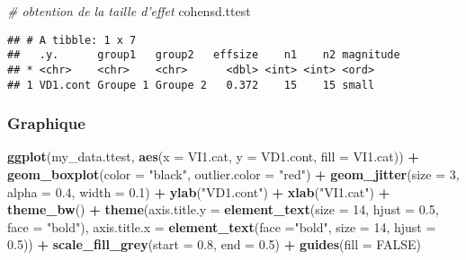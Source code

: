 \documentclass[
]{book}
\newenvironment{Shaded}{\begin{snugshade}}{\end{snugshade}}
\newcommand{\CommentTok}[1]{\textcolor[rgb]{0.56,0.35,0.01}{\textit{#1}}}
\newcommand{\DataTypeTok}[1]{\textcolor[rgb]{0.13,0.29,0.53}{#1}}
\newcommand{\DecValTok}[1]{\textcolor[rgb]{0.00,0.00,0.81}{#1}}
\newcommand{\FloatTok}[1]{\textcolor[rgb]{0.00,0.00,0.81}{#1}}
\newcommand{\KeywordTok}[1]{\textcolor[rgb]{0.13,0.29,0.53}{\textbf{#1}}}
\newcommand{\NormalTok}[1]{#1}
\newcommand{\OperatorTok}[1]{\textcolor[rgb]{0.81,0.36,0.00}{\textbf{#1}}}
\newcommand{\OtherTok}[1]{\textcolor[rgb]{0.56,0.35,0.01}{#1}}
\newcommand{\StringTok}[1]{\textcolor[rgb]{0.31,0.60,0.02}{#1}}
\begin{document}
\begin{Shaded}
\begin{Highlighting}[]
\CommentTok{# obtention de la taille d'effet}
\NormalTok{cohensd.ttest}
\end{Highlighting}
\end{Shaded}

\begin{verbatim}
## # A tibble: 1 x 7
##   .y.      group1   group2   effsize    n1    n2 magnitude
## * <chr>    <chr>    <chr>      <dbl> <int> <int> <ord>    
## 1 VD1.cont Groupe 1 Groupe 2   0.372    15    15 small
\end{verbatim}

\hypertarget{graphique}{%
\subsubsection{Graphique}\label{graphique}}

\begin{Shaded}
\begin{Highlighting}[]
\KeywordTok{ggplot}\NormalTok{(my_data.ttest, }\KeywordTok{aes}\NormalTok{(}\DataTypeTok{x =}\NormalTok{ VI1.cat, }\DataTypeTok{y =}\NormalTok{ VD1.cont, }\DataTypeTok{fill =}\NormalTok{ VI1.cat)) }\OperatorTok{+}
\StringTok{  }\KeywordTok{geom_boxplot}\NormalTok{(}\DataTypeTok{color =} \StringTok{"black"}\NormalTok{, }\DataTypeTok{outlier.color =} \StringTok{"red"}\NormalTok{) }\OperatorTok{+}\StringTok{ }
\StringTok{  }\KeywordTok{geom_jitter}\NormalTok{(}\DataTypeTok{size =} \DecValTok{3}\NormalTok{, }\DataTypeTok{alpha =} \FloatTok{0.4}\NormalTok{, }\DataTypeTok{width =} \FloatTok{0.1}\NormalTok{) }\OperatorTok{+}\StringTok{ }
\StringTok{  }\KeywordTok{ylab}\NormalTok{(}\StringTok{"VD1.cont"}\NormalTok{) }\OperatorTok{+}\StringTok{ }\KeywordTok{xlab}\NormalTok{(}\StringTok{"VI1.cat"}\NormalTok{) }\OperatorTok{+}\StringTok{ }
\StringTok{  }\KeywordTok{theme_bw}\NormalTok{() }\OperatorTok{+}\StringTok{ }
\StringTok{  }\KeywordTok{theme}\NormalTok{(}\DataTypeTok{axis.title.y =} \KeywordTok{element_text}\NormalTok{(}\DataTypeTok{size =} \DecValTok{14}\NormalTok{, }\DataTypeTok{hjust =} \FloatTok{0.5}\NormalTok{, }\DataTypeTok{face =} \StringTok{"bold"}\NormalTok{), }
        \DataTypeTok{axis.title.x =} \KeywordTok{element_text}\NormalTok{(}\DataTypeTok{face =}\StringTok{"bold"}\NormalTok{, }\DataTypeTok{size =} \DecValTok{14}\NormalTok{, }\DataTypeTok{hjust =} \FloatTok{0.5}\NormalTok{)) }\OperatorTok{+}
\StringTok{  }\KeywordTok{scale_fill_grey}\NormalTok{(}\DataTypeTok{start =} \FloatTok{0.8}\NormalTok{, }\DataTypeTok{end =} \FloatTok{0.5}\NormalTok{) }\OperatorTok{+}
\StringTok{  }\KeywordTok{guides}\NormalTok{(}\DataTypeTok{fill =} \OtherTok{FALSE}\NormalTok{)}
\end{Highlighting}
\end{Shaded}
\end{document}
